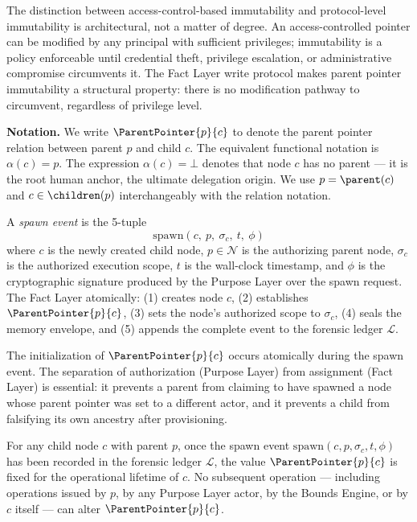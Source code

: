 The distinction between access-control-based immutability and protocol-level immutability is architectural, not a matter of degree. An access-controlled pointer can be modified by any principal with sufficient privileges; immutability is a policy enforceable until credential theft, privilege escalation, or administrative compromise circumvents it. The Fact Layer write protocol makes parent pointer immutability a structural property: there is no modification pathway to circumvent, regardless of privilege level.

\bigskip
\noindent\textbf{Notation.} We write $\ParentPointer{p}{c}$ to denote the parent pointer relation between parent $p$ and child $c$. The equivalent functional notation is $\alpha(c) = p$. The expression $\alpha(c) = \bot$ denotes that node $c$ has no parent --- it is the root human anchor, the ultimate delegation origin. We use $p = \parent(c)$ and $c \in \children(p)$ interchangeably with the relation notation.

\begin{dfn}
\label{dfn:spawn-event}
A \emph{spawn event} is the 5-tuple
\begin{equation}
\mathrm{spawn}(c,\ p,\ \sigma_c,\ t,\ \phi)
\end{equation}
where $c$ is the newly created child node, $p \in \mathcal{N}$ is the authorizing parent node, $\sigma_c$ is the authorized execution scope, $t$ is the wall-clock timestamp, and $\phi$ is the cryptographic signature produced by the Purpose Layer over the spawn request. The Fact Layer atomically: (1) creates node $c$, (2) establishes $\ParentPointer{p}{c}$, (3) sets the node's authorized scope to $\sigma_c$, (4) seals the memory envelope, and (5) appends the complete event to the forensic ledger $\mathcal{L}$.
\end{dfn}

The initialization of $\ParentPointer{p}{c}$ occurs atomically during the spawn event. The separation of authorization (Purpose Layer) from assignment (Fact Layer) is essential: it prevents a parent from claiming to have spawned a node whose parent pointer was set to a different actor, and it prevents a child from falsifying its own ancestry after provisioning.

\begin{prop}
\label{prop:parent-pointer-immutable}
For any child node $c$ with parent $p$, once the spawn event $\mathrm{spawn}(c, p, \sigma_c, t, \phi)$ has been recorded in the forensic ledger $\mathcal{L}$, the value $\ParentPointer{p}{c}$ is fixed for the operational lifetime of $c$. No subsequent operation --- including operations issued by $p$, by any Purpose Layer actor, by the Bounds Engine, or by $c$ itself --- can alter $\ParentPointer{p}{c}$.
\end{prop}

